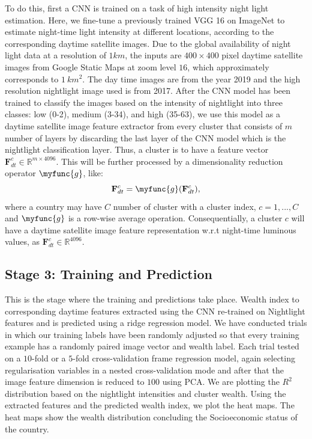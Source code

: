 To do this, first a \ac{CNN} is trained on a task of high intensity night light estimation. Here, we fine-tune a previously trained VGG 16 on ImageNet to estimate night-time light intensity at different locations, according to the corresponding daytime satellite images. 
Due to the global availability of night light data at a resolution of $1 km$, the inputs are $400 \times 400$ pixel daytime satellite images from Google Static Maps at zoom level $16$, which approximately corresponds to $1~km^2$. The day time images are from the year 2019 and the high resolution nightlight image used is from 2017. After the \ac{CNN} model has been trained to classify the images based on the intensity of nightlight into three classes: low (0-2), medium (3-34), and high (35-63), we use this model as a daytime satellite image feature extractor from every cluster that consists of $m$ number of layers by discarding the last layer of the \ac{CNN} model which is the nightlight classification layer. Thus, a cluster is to have a feature vector $\mathbf{F}^c_{dt} \in \mathbb{R}^{m\times 4096}$. This will be further processed by a dimensionality reduction operator $\myfunc{g}$, like:
\begin{equation}
    \mathbf{F}^c_{dt} = \myfunc{g}(\mathbf{F}^c_{dt}), 
    \label{eqn:avg_op}
\end{equation}
where a country may have $C$ number of cluster with a cluster index, $c={1,...,C}$ and $\myfunc{g}$ is a row-wise average operation. Consequentially, a cluster $c$ will have a daytime satellite image feature representation w.r.t night-time luminous values, as $\mathbf{F}^c_{dt} \in \mathbb{R}^{4096}$.

\subsection{Stage 3: Training and Prediction}

This is the stage where the training and predictions take place. Wealth index to corresponding daytime features extracted using the \ac{CNN} re-trained on Nightlight features and is predicted using a ridge regression model. We have conducted trials in which our training labels have been randomly adjusted so that every training example has a randomly paired image vector and wealth label. Each trial tested on a $10$-fold or a $5$-fold cross-validation frame regression model, again selecting regularisation variables in a nested cross-validation mode and after that the image feature dimension is reduced to $100$ using \ac{PCA}. We are plotting the \( R^2\) distribution based on the nightlight intensities and cluster wealth. Using the extracted features and the predicted wealth index, we plot the heat maps. The heat maps show the wealth distribution concluding the Socioeconomic status of the country.






